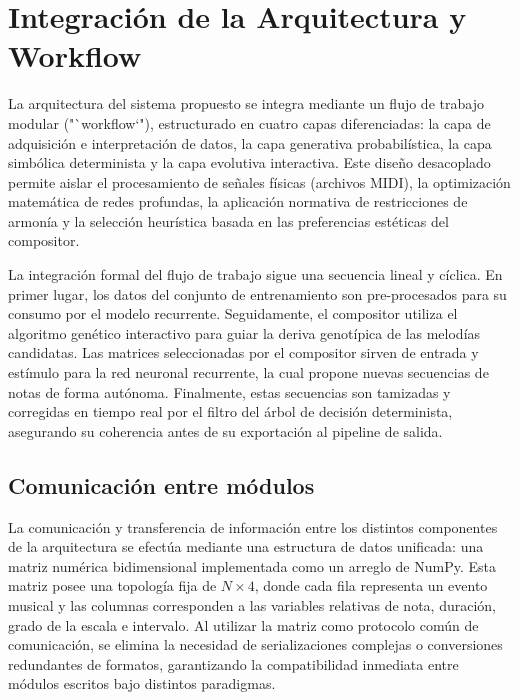 \section{Integración de la Arquitectura y Workflow}

La arquitectura del sistema propuesto se integra mediante un flujo de trabajo modular ("`workflow`"), estructurado en cuatro capas diferenciadas: la capa de adquisición e interpretación de datos, la capa generativa probabilística, la capa simbólica determinista y la capa evolutiva interactiva. Este diseño desacoplado permite aislar el procesamiento de señales físicas (archivos MIDI), la optimización matemática de redes profundas, la aplicación normativa de restricciones de armonía y la selección heurística basada en las preferencias estéticas del compositor. 

La integración formal del flujo de trabajo sigue una secuencia lineal y cíclica. En primer lugar, los datos del conjunto de entrenamiento son pre-procesados para su consumo por el modelo recurrente. Seguidamente, el compositor utiliza el algoritmo genético interactivo para guiar la deriva genotípica de las melodías candidatas. Las matrices seleccionadas por el compositor sirven de entrada y estímulo para la red neuronal recurrente, la cual propone nuevas secuencias de notas de forma autónoma. Finalmente, estas secuencias son tamizadas y corregidas en tiempo real por el filtro del árbol de decisión determinista, asegurando su coherencia antes de su exportación al pipeline de salida.

\subsection{Comunicación entre módulos}

La comunicación y transferencia de información entre los distintos componentes de la arquitectura se efectúa mediante una estructura de datos unificada: una matriz numérica bidimensional implementada como un arreglo de NumPy. Esta matriz posee una topología fija de $N \times 4$, donde cada fila representa un evento musical y las columnas corresponden a las variables relativas de nota, duración, grado de la escala e intervalo. Al utilizar la matriz como protocolo común de comunicación, se elimina la necesidad de serializaciones complejas o conversiones redundantes de formatos, garantizando la compatibilidad inmediata entre módulos escritos bajo distintos paradigmas.

